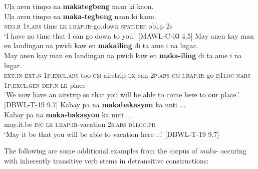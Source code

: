 \ea
\label{bkm:Ref447964968}
Uļa  aren  timpo  na  \textbf{makategbeng}  naan  ki  kaon. \\\smallskip
 \gll Uļa  aren  timpo  na  \textbf{maka-tegbeng}  naan  ki  kaon. \\
\textsc{neg.r}  1\textsc{s.abs} time \textsc{lk}  \textsc{i.hap.ir}-go.down \textsc{spat.def}  {obl.p} 2s \\
\glt ‘I have no time that I can go down to you.’ [MAWL-C-03 4.5]
\z
\ea
May  anen  kay  man  en  landingan  na  pwidi  kaw  en \textbf{makailing}  di  ta  ame  i  na  lugar. \\\smallskip
 \gll May  anen  kay  man  en  landingan  na  pwidi  kaw  en \textbf{maka-iling}  di  ta  ame  i  na  lugar. \\
\textsc{ext.in}  \textsc{ext.g} 1\textsc{p.excl.abs}  too  \textsc{cm}  airstrip  \textsc{lk}  can  2\textsc{p.abs}  \textsc{cm}
\textsc{i.hap.ir}-go  \textsc{d}1\textsc{loc  nabs}  1\textsc{p.excl.gen}  \textsc{def.n}  \textsc{lk}  place \\
\glt `We now have an airstrip so that you will be able to come here to our place.’ [DBWL-T-19 9.7]
\z
\ea
\label{bkm:Ref120014968}
Kabay  pa  na  \textbf{makabakasyon}  ka  unti ... \\\smallskip
 \gll Kabay  pa  na  \textbf{maka-bakasyon}  ka  unti ... \\
may.it.be  \textsc{inc}  \textsc{lk}  \textsc{i.hap.ir}-vacation  2\textsc{s.abs}  \textsc{d}1\textsc{loc.pr} \\
\glt ‘May it be that you will be able to vacation here ...’ [DBWL-T-19 9.7]
\z

The following are some additional examples from the corpus of \textit{maka}{}- occuring with inherently transitive verb stems in detransitive constructions:

